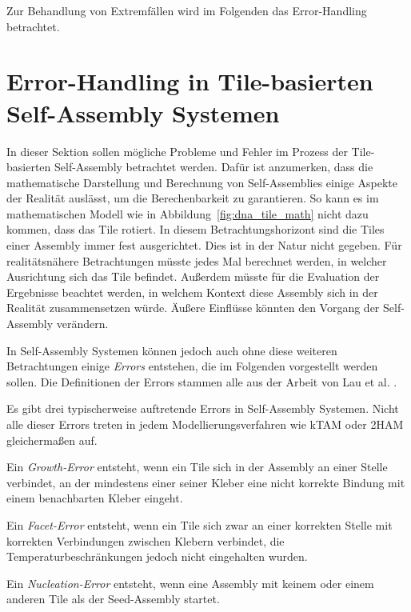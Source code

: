 Zur Behandlung von Extremfällen wird im Folgenden das Error-Handling betrachtet.

\section{Error-Handling in Tile-basierten Self-Assembly Systemen}
\label{sec:proofreading}
In dieser Sektion sollen mögliche Probleme und Fehler im Prozess der Tile-basierten Self-Assembly betrachtet werden.
Dafür ist anzumerken, dass die mathematische Darstellung und Berechnung von Self-Assemblies einige Aspekte der Realität auslässt, um die Berechenbarkeit zu garantieren. 
So kann es im mathematischen Modell wie in Abbildung~\ref{fig:dna_tile_math} nicht dazu kommen, dass das Tile rotiert. In diesem Betrachtungshorizont sind die Tiles einer Assembly immer fest ausgerichtet. 
Dies ist in der Natur nicht gegeben. 
Für realitätsnähere Betrachtungen müsste jedes Mal berechnet werden, in welcher Ausrichtung sich das Tile befindet. 
Außerdem müsste für die Evaluation der Ergebnisse beachtet werden, in welchem Kontext diese Assembly sich in der Realität zusammensetzen würde. Äußere Einflüsse könnten den Vorgang der Self-Assembly verändern. 

In Self-Assembly Systemen können jedoch auch ohne diese weiteren Betrachtungen einige \emph{Errors} entstehen, die im Folgenden vorgestellt werden sollen. Die Definitionen der Errors stammen alle aus der Arbeit von Lau et al. \cite{lau2019dnatiles}.

Es gibt drei typischerweise auftretende Errors in Self-Assembly Systemen. 
Nicht alle dieser Errors treten in jedem Modellierungsverfahren wie kTAM oder 2HAM gleichermaßen auf.
\begin{definition}
	Ein \emph{Growth-Error} entsteht, wenn ein Tile sich in der Assembly an einer Stelle verbindet, an der mindestens einer seiner Kleber eine nicht korrekte Bindung mit einem benachbarten Kleber eingeht.
\end{definition}
\begin{definition}
	Ein \emph{Facet-Error} entsteht, wenn ein Tile sich zwar an einer korrekten Stelle mit korrekten Verbindungen zwischen Klebern verbindet, die Temperaturbeschränkungen jedoch nicht eingehalten wurden.
\end{definition}
\begin{definition}
	Ein \emph{Nucleation-Error} entsteht, wenn eine Assembly mit keinem oder einem anderen Tile als der Seed-Assembly startet.
\end{definition}

